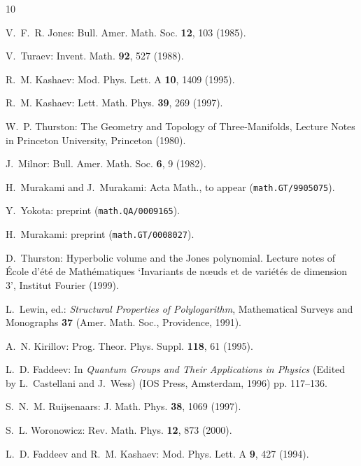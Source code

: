\documentclass[12pt]{article}
\numberwithin{equation}{section}
\begin{document}
\begin{thebibliography}{10}

  V.~F.~R. Jones: Bull. Amer. Math. Soc. \textbf{12}, 103 (1985).

  V.~Turaev: Invent. Math. \textbf{92}, 527 (1988).

  R.~M. Kashaev: Mod. Phys. Lett. A \textbf{10}, 1409 (1995).

  R.~M. Kashaev: Lett. Math. Phys. \textbf{39}, 269 (1997).

  W.~P. Thurston: The Geometry and Topology of Three-Manifolds,
  \newblock Lecture Notes in Princeton University, Princeton (1980).

  J.~Milnor: Bull. Amer. Math. Soc. \textbf{6}, 9 (1982).

  H.~Murakami and J.~Murakami:
  Acta Math., to appear
  (\texttt{math.GT/9905075}).

  Y.~Yokota:
  preprint
  (\texttt{math.QA/0009165}).

  H.~Murakami:
  preprint
  (\texttt{math.GT/0008027}).

  D.~Thurston: Hyperbolic volume and the {Jones} polynomial.
  \newblock Lecture notes of {\'E}cole d'{\'e}t{\'e} de Math{\'e}matiques `Invariants de
  n{\oe}uds
  et de vari{\'e}t{\'e}s de dimension 3', Institut Fourier (1999).

  L.~Lewin, ed.: \emph{Structural Properties of Polylogarithm},
  {Mathematical Surveys and Monographs} \textbf{37}
  (Amer. Math. Soc., Providence,
  1991).

  A.~N. Kirillov: Prog. Theor. Phys. Suppl. \textbf{118}, 61 (1995).

  L.~D. Faddeev: In \emph{Quantum Groups and Their Applications in Physics}
  (Edited by L.~Castellani and J.~Wess) (IOS Press, Amsterdam, 1996)  pp.
  117--136.

  S.~N.~M. Ruijsenaars: J. Math. Phys. \textbf{38}, 1069 (1997).

  S.~L. Woronowicz: Rev. Math. Phys. \textbf{12}, 873 (2000).

  L.~D. Faddeev and R.~M. Kashaev: Mod. Phys. Lett. A \textbf{9}, 427 (1994).


\end{thebibliography}
\end{document}

